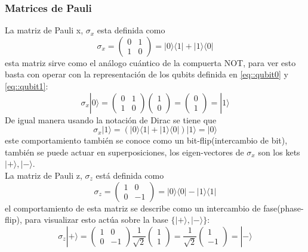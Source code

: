 \documentclass[a4paper]{article}
\begin{document}
\subsubsection{Matrices de Pauli}\label{sec::PauliMatrix}
La matriz de Pauli x, $\sigma_x$ esta definida como 
\begin{equation}
\sigma_x=\begin{pmatrix}
		0 &1 \\
		1 &0
	\end{pmatrix}=|0\rangle\langle 1|+|1\rangle\langle 0|
\end{equation}
esta matriz sirve como el análogo cuántico de la compuerta NOT, para ver esto basta con operar con la representación de los qubits definida en \ref{eq::qubit0} y \ref{eq::qubit1}:
\begin{equation}
\sigma_x|0\rangle=
	\begin{pmatrix}
		0 &1 \\
		1 &0
	\end{pmatrix}
	\begin{pmatrix}
		1 \\
		0
	\end{pmatrix}=
	\begin{pmatrix}
		0 \\
		1
	\end{pmatrix}=|1\rangle
\end{equation}
De igual manera usando la notación de Dirac se tiene que
\begin{equation}
\sigma_x|1\rangle=(|0\rangle\langle 1|+|1\rangle\langle 0|)|1\rangle=|0\rangle
\end{equation}
este comportamiento también se conoce como un bit-flip(intercambio de bit), también se puede actuar en superposiciones, los eigen-vectores de $\sigma_x$ son los kets $|+\rangle, |-\rangle$.\\
La matriz de Pauli z, $\sigma_z$ está definida como 
\begin{equation}
\sigma_z=
	\begin{pmatrix}
		1 &0 \\
		0 &-1
	\end{pmatrix}=|0\rangle\langle 0|-|1\rangle\langle 1|
\end{equation}
el comportamiento de esta matriz se describe como un intercambio de fase(phase-flip), para visualizar esto actúa sobre la base $\{|+\rangle, |-\rangle\}$:
\begin{equation}
\sigma_z|+\rangle=
	\begin{pmatrix}
		1 &0 \\
		0 &-1
	\end{pmatrix}\frac{1}{\sqrt{2}}
	\begin{pmatrix}
		1 \\
		1
	\end{pmatrix}=\frac{1}{\sqrt{2}}
	\begin{pmatrix}
		1 \\
		-1
	\end{pmatrix}=|-\rangle
\end{equation}
\end{document}
